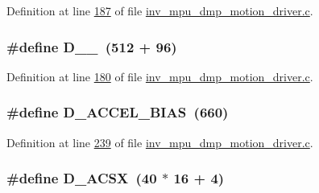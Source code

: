 Definition at line \hyperlink{inv__mpu__dmp__motion__driver_8c_source_l00187}{187} of file \hyperlink{inv__mpu__dmp__motion__driver_8c_source}{inv\+\_\+mpu\+\_\+dmp\+\_\+motion\+\_\+driver.\+c}.

\subsubsection[{\texorpdfstring{D\+\_\+2\+\_\+96}{D_2_96}}]{\setlength{\rightskip}{0pt plus 5cm}\#define D\+\_\+\_~(512 + 96)}\hypertarget{group___d_r_i_v_e_r_s_ga36e10f13d70b3d8e038d39d807587202}{}\label{group___d_r_i_v_e_r_s_ga36e10f13d70b3d8e038d39d807587202}


Definition at line \hyperlink{inv__mpu__dmp__motion__driver_8c_source_l00180}{180} of file \hyperlink{inv__mpu__dmp__motion__driver_8c_source}{inv\+\_\+mpu\+\_\+dmp\+\_\+motion\+\_\+driver.\+c}.

\subsubsection[{\texorpdfstring{D\+\_\+\+A\+C\+C\+E\+L\+\_\+\+B\+I\+AS}{D_ACCEL_BIAS}}]{\setlength{\rightskip}{0pt plus 5cm}\#define D\+\_\+\+A\+C\+C\+E\+L\+\_\+\+B\+I\+AS~(660)}\hypertarget{group___d_r_i_v_e_r_s_ga2cc522b8f621f32418257ab61144a744}{}\label{group___d_r_i_v_e_r_s_ga2cc522b8f621f32418257ab61144a744}


Definition at line \hyperlink{inv__mpu__dmp__motion__driver_8c_source_l00239}{239} of file \hyperlink{inv__mpu__dmp__motion__driver_8c_source}{inv\+\_\+mpu\+\_\+dmp\+\_\+motion\+\_\+driver.\+c}.

\subsubsection[{\texorpdfstring{D\+\_\+\+A\+C\+SX}{D_ACSX}}]{\setlength{\rightskip}{0pt plus 5cm}\#define D\+\_\+\+A\+C\+SX~(40 $\ast$ 16 + 4)}\hypertarget{group___d_r_i_v_e_r_s_ga3d6aba10b057d1b66f0c5f33334afb07}{}\label{group___d_r_i_v_e_r_s_ga3d6aba10b057d1b66f0c5f33334afb07}


